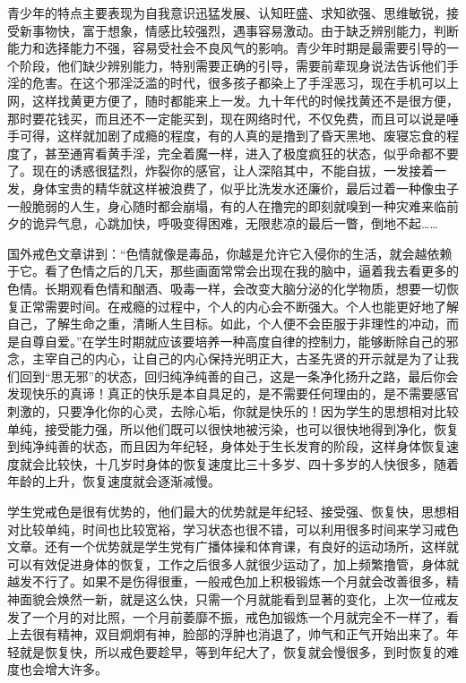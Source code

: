 青少年的特点主要表现为自我意识迅猛发展、认知旺盛、求知欲强、思维敏锐，接受新事物快，富于想象，情感比较强烈，遇事容易激动。由于缺乏辨别能力，判断能力和选择能力不强，容易受社会不良风气的影响。青少年时期是最需要引导的一个阶段，他们缺少辨别能力，特别需要正确的引导，需要前辈现身说法告诉他们手淫的危害。在这个邪淫泛滥的时代，很多孩子都染上了手淫恶习，现在手机可以上网，这样找黄更方便了，随时都能来上一发。九十年代的时候找黄还不是很方便，那时要花钱买，而且还不一定能买到，现在网络时代，不仅免费，而且可以说是唾手可得，这样就加剧了成瘾的程度，有的人真的是撸到了昏天黑地、废寝忘食的程度了，甚至通宵看黄手淫，完全着魔一样，进入了极度疯狂的状态，似乎命都不要了。现在的诱惑很猛烈，炸裂你的感官，让人深陷其中，不能自拔，一发接着一发，身体宝贵的精华就这样被浪费了，似乎比洗发水还廉价，最后过着一种像虫子一般脆弱的人生，身心随时都会崩塌，有的人在撸完的即刻就嗅到一种灾难来临前夕的诡异气息，心跳加快，呼吸变得困难，无限悲凉的最后一瞥，倒地不起……

国外戒色文章讲到：“色情就像是毒品，你越是允许它入侵你的生活，就会越依赖于它。看了色情之后的几天，那些画面常常会出现在我的脑中，逼着我去看更多的色情。长期观看色情和酗酒、吸毒一样，会改变大脑分泌的化学物质，想要一切恢复正常需要时间。在戒瘾的过程中，个人的内心会不断强大。个人也能更好地了解自己，了解生命之重，清晰人生目标。如此，个人便不会臣服于非理性的冲动，而是自尊自爱。”在学生时期就应该要培养一种高度自律的控制力，能够断除自己的邪念，主宰自己的内心，让自己的内心保持光明正大，古圣先贤的开示就是为了让我们回到“思无邪”的状态，回归纯净纯善的自己，这是一条净化扬升之路，最后你会发现快乐的真谛！真正的快乐是本自具足的，是不需要任何理由的，是不需要感官刺激的，只要净化你的心灵，去除心垢，你就是快乐的！因为学生的思想相对比较单纯，接受能力强，所以他们既可以很快地被污染，也可以很快地得到净化，恢复到纯净纯善的状态，而且因为年纪轻，身体处于生长发育的阶段，这样身体恢复速度就会比较快，十几岁时身体的恢复速度比三十多岁、四十多岁的人快很多，随着年龄的上升，恢复速度就会逐渐减慢。

学生党戒色是很有优势的，他们最大的优势就是年纪轻、接受强、恢复快，思想相对比较单纯，时间也比较宽裕，学习状态也很不错，可以利用很多时间来学习戒色文章。还有一个优势就是学生党有广播体操和体育课，有良好的运动场所，这样就可以有效促进身体的恢复，工作之后很多人就很少运动了，加上频繁撸管，身体就越发不行了。如果不是伤得很重，一般戒色加上积极锻炼一个月就会改善很多，精神面貌会焕然一新，就是这么快，只需一个月就能看到显著的变化，上次一位戒友发了一个月的对比照，一个月前萎靡不振，戒色加锻炼一个月就完全不一样了，看上去很有精神，双目炯炯有神，脸部的浮肿也消退了，帅气和正气开始出来了。年轻就是恢复快，所以戒色要趁早，等到年纪大了，恢复就会慢很多，到时恢复的难度也会增大许多。

